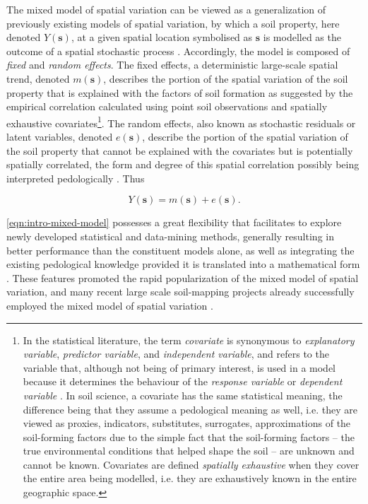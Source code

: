 \def\footcovar{\footnote{In the statistical literature, the term \emph{covariate} is synonymous to 
\emph{explanatory variable}, \emph{predictor variable}, and \emph{independent variable}, and refers to the 
variable that, although not being of primary interest, is used in a model because it determines the behaviour 
of the \emph{response variable} or \emph{dependent variable} \cite{Everitt2006}. In soil science, a covariate 
has the same statistical meaning, the difference being that they assume a pedological meaning as well, i.e. 
they are viewed as proxies, indicators, substitutes, surrogates, approximations of the soil-forming factors 
due to the simple fact that the soil-forming factors -- the true environmental conditions that helped shape 
the soil -- are unknown and cannot be known. Covariates are defined \emph{spatially exhaustive} when they 
cover the entire area being modelled, i.e. they are exhaustively known in the entire geographic space.}}

The mixed model of spatial variation\footmixed{} can be viewed as a generalization of previously existing 
models of spatial variation, by which a soil property, here denoted $Y(\boldsymbol{s})$, at a given spatial 
location symbolised as $\boldsymbol{s}$ is modelled as the outcome of a spatial stochastic process 
\cite{Cressie1993, HeuvelinkEtAl2001, LarkEtAl2006}. Accordingly, the model is composed of \emph{fixed} and 
\emph{random effects}. The fixed effects, a deterministic large-scale spatial trend, denoted 
$m(\boldsymbol{s})$, describes the portion of the spatial variation of the soil property that is explained 
with the factors of soil formation as suggested by the empirical correlation calculated using point soil 
observations and spatially exhaustive covariates\footcovar. The random effects, also known as stochastic 
residuals or latent variables, denoted $e(\boldsymbol{s})$, describe the portion of the spatial variation of 
the soil property that cannot be explained with the covariates but is potentially spatially correlated, the 
form and degree of this spatial correlation possibly being interpreted pedologically \cite{Lark2012}. Thus 

\begin{equation}\label{eqn:intro-mixed-model}
Y(\boldsymbol{s}) = m(\boldsymbol{s}) + e(\boldsymbol{s}).
\end{equation}

\autoref{eqn:intro-mixed-model} possesses a great flexibility that facilitates to explore newly developed 
statistical and data-mining methods, generally resulting in better performance than the constituent models 
alone, as well as integrating the existing pedological knowledge provided it is translated into a mathematical 
form \cite{OdehEtAl1994, OdehEtAl1995, Heuvelink1996, McBratneyEtAl2000, HenglEtAl2004, Lopez-GranadosEtAl2005, 
WebsterEtAl2007, Grunwald2009, Lark2012}. These features promoted the rapid popularization of the mixed model 
of spatial variation, and many recent large scale soil-mapping projects already successfully employed the 
mixed model of spatial variation \cite{PoggioEtAl2014, NussbaumEtAl2014, HenglEtAl2015}.

